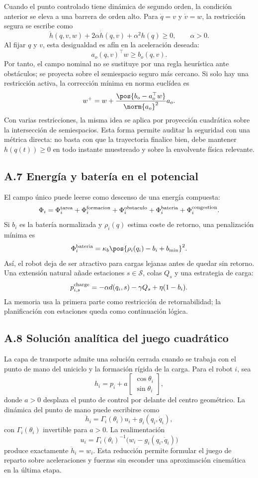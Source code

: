 Cuando el punto controlado tiene dinámica de segundo orden, la condición anterior se
eleva a una barrera de orden alto. Para $\dot q=v$ y $\dot v=w$, la restricción segura se
escribe como
\[
  \ddot h(q,v,w)+2\alpha \dot h(q,v)+\alpha^2 h(q)\geq 0,
  \qquad \alpha>0 .
\]
Al fijar $q$ y $v$, esta desigualdad es afín en la aceleración deseada:
\[
  a_o(q,v)^\top w \ge b_o(q,v).
\]
Por tanto, el campo nominal no se sustituye por una regla heurística ante obstáculos; se
proyecta sobre el semiespacio seguro más cercano. Si solo hay una restricción activa, la
corrección mínima en norma euclídea es
\[
  w^+ =
  w+
  \frac{\pos{b_o-a_o^\top w}}{\norm{a_o}^2}a_o .
\]
Con varias restricciones, la misma idea se aplica por proyección cuadrática sobre la
intersección de semiespacios. Esta forma permite auditar la seguridad con una métrica
directa: no basta con que la trayectoria finalice bien, debe mantener $h(q(t))\geq0$ en
todo instante muestreado y sobre la envolvente física relevante.

\subsection*{A.7 Energía y batería en el potencial}

El campo único puede leerse como descenso de una energía compuesta:
\[
  \Phi_i =
  \Phi_i^{\rm tarea}+\Phi_i^{\rm formacion}+\Phi_i^{\rm obstaculo}
  +\Phi_i^{\rm bateria}+\Phi_i^{\rm congestion}.
\]
Si $b_i$ es la batería normalizada y $\rho_i(q)$ estima coste de retorno, una penalización
mínima es
\[
  \Phi_i^{\rm bateria} =
  \kappa_b \pos{\rho_i(q_i)-b_i+b_{\min}}^2 .
\]
Así, el robot deja de ser atractivo para cargas lejanas antes de quedar sin retorno. Una
extensión natural añade estaciones $s\in\mathcal S$, colas $Q_s$ y una estrategia de
carga:
\[
  p_{i,s}^{\rm charge}= -\alpha d(q_i,s)-\gamma Q_s+\eta(1-b_i).
\]
La memoria usa la primera parte como restricción de retornabilidad; la planificación con
estaciones queda como continuación lógica.

\subsection*{A.8 Solución analítica del juego cuadrático}

La capa de transporte admite una solución cerrada cuando se trabaja con el punto de mano
del uniciclo y la formación rígida de la carga. Para el robot $i$, sea
\[
  h_i=p_i+a
  \begin{bmatrix}
  \cos\theta_i\\ \sin\theta_i
  \end{bmatrix},
\]
donde $a>0$ desplaza el punto de control por delante del centro geométrico. La dinámica
del punto de mano puede escribirse como
\[
  \ddot h_i=\Gamma_i(\theta_i)u_i+g_i(q_i,\dot q_i),
\]
con $\Gamma_i(\theta_i)$ invertible para $a>0$. La realimentación
\[
  u_i=\Gamma_i(\theta_i)^{-1}\bigl(w_i-g_i(q_i,\dot q_i)\bigr)
\]
produce exactamente $\ddot h_i=w_i$. Esta reducción permite formular el juego de reparto
sobre aceleraciones y fuerzas sin esconder una aproximación cinemática en la última etapa.


